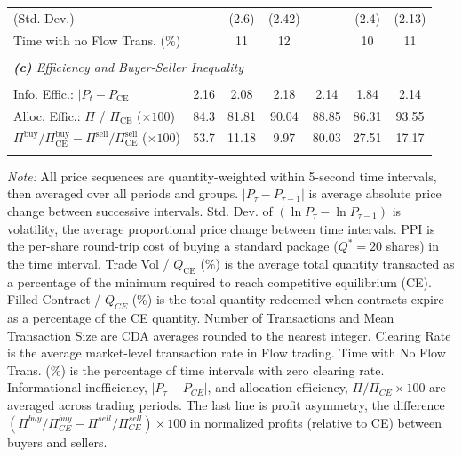 \documentclass[12pt]{article}
\begin{document}
\begin{table}[!h]
{\begin{threeparttable}
\begin{tabular}{lccc|ccc}
     \hspace{3mm}(Std. Dev.)             &           & (2.6)    & (2.42)     &           & (2.4)     & (2.13)   \\
      Time with no Flow Trans. (\%)               &           & 11      & 12    &           & 10        & 11   \\

     \\ [-1.8ex]
     \multicolumn{7}{l}{\textit{\textbf{(c)} Efficiency and Buyer-Seller Inequality}} \\
     \\ [-1.8ex]
     
     Info. Effic.: $\lvert P_t - P_{\text{CE}} \rvert $        & 2.16      & 2.08    & 2.18  & 2.14      & 1.84    & 2.14  \\     
     Alloc. Effic.: $\Pi$ / $\Pi_{\text{CE}}$ ($\times 100$)   & 84.3      & 81.81    & 90.04     & 88.85     & 86.31     & 93.55   \\
     
     ${\Pi^{\text{buy}}}/{\Pi^{\text{buy}}_{\text{CE}}} - {\Pi^{\text{sell}}}/{\Pi^{\text{sell}}_{\text{CE}}}$ 
     ($\times 100$) & 53.7      & 11.18    & 9.97    & 80.03     & 27.51    & 17.17    \\
     \\[-1.8ex] 
    \bottomrule
    \end{tabular}
    \begin{tablenotes}
\footnotesize
\textit{Note:} 
All price sequences are quantity-weighted within 5-second time intervals, then averaged over all periods and groups. 
$|P_{\tau} - P_{\tau-1}|$ is average absolute price change between successive intervals. 
Std. Dev. of $\left( \ln P_{\tau} - \ln P_{\tau-1} \right)$ is volatility, the average proportional price change between time intervals. 
PPI is the per-share round-trip cost of buying a standard package ($Q^* = 20$ shares) in the time interval.
Trade Vol / $Q_{\text{CE}}$ (\%) is the average total quantity transacted as a percentage of the minimum required to reach competitive equilibrium (CE). Filled Contract / $Q_{CE}$ (\%) is the total quantity redeemed when contracts expire as a percentage of the CE quantity.
    Number of Transactions and Mean Transaction Size are CDA averages rounded to the nearest integer. 
    Clearing Rate is the average market-level transaction rate in Flow trading. 
    Time with No Flow Trans. (\%) is the percentage of time intervals with zero clearing rate. 
    Informational inefficiency, $|P_{\tau} - P_{CE}|$, and allocation efficiency, $ \Pi/\Pi_{CE} \times 100$ are averaged across trading periods.
    The last line is profit asymmetry, the difference $(\Pi^{buy}/\Pi^{buy}_{CE} - \Pi^{sell}/\Pi^{sell}_{CE}) \times 100$ in normalized profits (relative to CE) between buyers and sellers. 
    \end{tablenotes} 
\end{threeparttable}

   }
\end{table}
\end{document}
